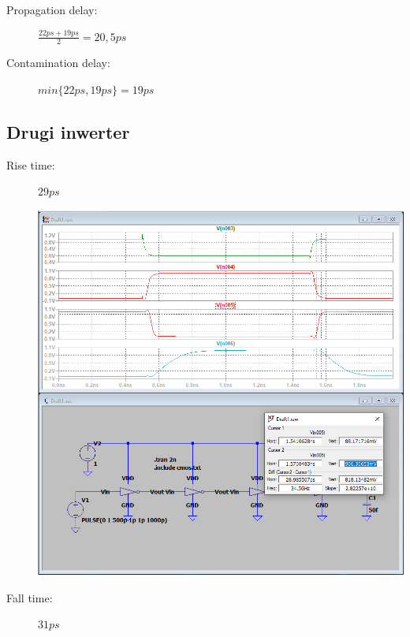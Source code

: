 \documentclass[a4paper, 11pt]{article}
\begin{document}
\begin{description}
\begin{center}
	      \end{center}
	\item[Propagation delay:] $\frac{22ps + 19ps}{2} = 20,5ps $
	\item[Contamination delay:] $ min\{22ps, 19ps\} = 19ps $
\end{description}

\pagebreak
\subsection{Drugi inwerter}
\begin{description}
	\item[Rise time:] $29 ps$ \hfill
	      \begin{center}
		      \includegraphics[scale=0.38]{mikro_lab3/rise_time2.PNG}
	      \end{center}
	\item[Fall time:] $31 ps$ \hfill
	      \begin{center}

\end{center}
\end{description}
\end{document}
